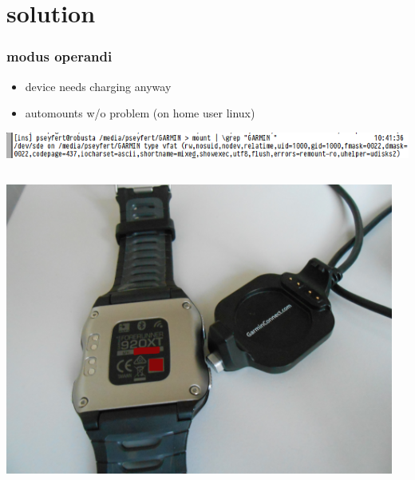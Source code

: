 \documentclass[table,xcolor=dvipsnames,professionalfonts]{beamer}
\begin{document}
\section{solution}
\begin{frame}
  \frametitle{modus operandi}
  \begin{itemize}
    \item device needs charging anyway
    \item automounts w/o problem (on home user linux)
  \end{itemize}
  \includegraphics[width=\textwidth]{./mount.png}
  \begin{columns}
    \begin{column}{.5\textwidth}
      \includegraphics[width=.98\textwidth]{./forerunner_usb.JPG}
    \end{column}
    \begin{column}{.5\textwidth}

\end{column}
\end{columns}
\end{frame}
\end{document}
